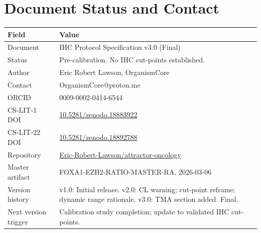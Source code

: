 \documentclass[11pt, a4paper]{article}
\begin{document}
\section{Document Status and Contact}

\begin{center}
\begin{tabular}{ll}
\toprule
\textbf{Field} & \textbf{Value} \\
\midrule
Document &
IHC Protocol Specification v3.0
(Final) \\
Status &
Pre-calibration.
No IHC cut-points established. \\
Author &
Eric Robert Lawson, OrganismCore \\
Contact &
OrganismCore@proton.me \\
ORCID & 0009-0002-0414-6544 \\
CS-LIT-1 DOI &
\href{https://doi.org/10.5281/zenodo.18883922}
{10.5281/zenodo.18883922} \\
CS-LIT-22 DOI &
\href{https://doi.org/10.5281/zenodo.18892788}
{10.5281/zenodo.18892788} \\
Repository &
\href{https://github.com/Eric-Robert-Lawson/attractor-oncology}
{Eric-Robert-Lawson/attractor-oncology} \\
Master artifact &
FOXA1-EZH2-RATIO-MASTER-RA,
2026-03-06 \\
Version history &
v1.0: Initial release.
v2.0: CL warning; cut-point
reframe; dynamic range rationale.
v3.0: TMA section added. Final. \\
Next version trigger &
Calibration study completion;
update to validated IHC
cut-points. \\
\bottomrule
\end{tabular}
\end{center}
\end{document}
